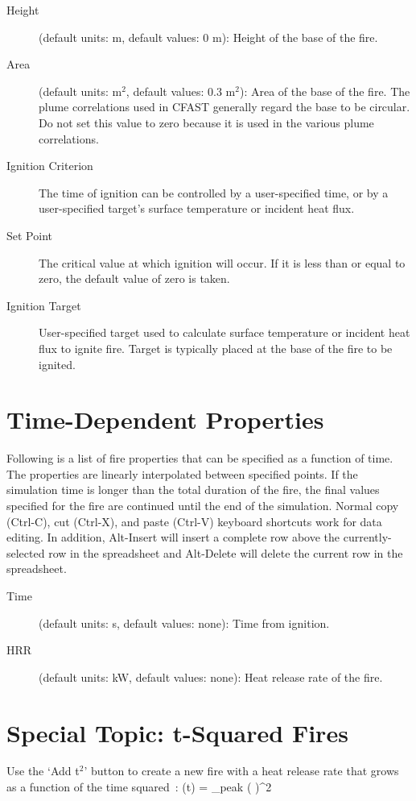 \begin{description}
\item[Height] (default units: m, default values: 0 m): Height of the base of the fire.
\item[Area] (default units: m$^2$, default values: 0.3 m$^2$): Area of the base of the fire. The plume correlations used in CFAST generally regard the base to be circular. Do not set this value to zero because it is used in the various plume correlations.
\item[Ignition Criterion] The time of ignition can be controlled by a user-specified time, or by a user-specified target's surface temperature or incident heat flux.
\item[Set Point] The critical value at which ignition will occur. If it is less than or equal to zero, the default value of zero is taken.
\item[Ignition Target] User-specified target used to calculate surface temperature or incident heat flux to ignite fire. Target is typically placed at the base of the fire to be ignited.
\end{description}




\section{Time-Dependent Properties}
\label{info:FIRE2}
Following is a list of fire properties that can be specified as a function of time. The properties are linearly interpolated between specified points. If the simulation time is longer than the total duration of the fire, the final values specified for the fire are continued until the end of the simulation. Normal copy (Ctrl-C), cut (Ctrl-X), and paste (Ctrl-V) keyboard shortcuts work for data editing. In addition, Alt-Insert will insert a complete row above the currently-selected row in the spreadsheet and Alt-Delete will delete the current row in the spreadsheet.
\begin{description}
\item[Time] (default units: s, default values: none): Time from ignition.
\item[HRR] (default units: kW, default values: none): Heat release rate of the fire.
\end{description}




\section{Special Topic: t-Squared Fires}
\label{tsq}
Use the `Add t$^2$' button to create a new fire with a heat release rate that grows as a function of the time squared~\cite{Schifiliti:2002}:
\be
   \dQ(t) = \dQ_{\rm peak} \; \left(  \right)^2
\ee

